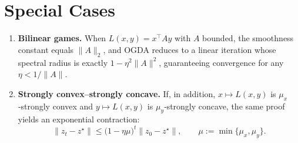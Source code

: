 \documentclass{article}
\begin{document}
\section*{Special Cases}
\begin{enumerate}
\item \textbf{Bilinear games.} When $L(x,y)=x^{\top}Ay$ with $A$ bounded,
the smoothness constant equals $\|A\|_{2}$, and OGDA reduces to a linear
iteration whose spectral radius is exactly $1-\eta^{2}\|A\|^{2}$,
guaranteeing convergence for any $\eta<1/\|A\|$.
\item \textbf{Strongly convex–strongly concave.} If, in addition,
$x\mapsto L(x,y)$ is $\mu_{x}$‑strongly convex and $y\mapsto L(x,y)$ is
$\mu_{y}$‑strongly concave, the same proof yields an exponential
contraction:
\[
\|z_{t}-z^{\star}\|\le \bigl(1-\eta\mu\bigr)^{t}\|z_{0}-z^{\star}\|,
\qquad \mu:=\min\{\mu_{x},\mu_{y}\}.
\]
\end{enumerate}
\end{document}

